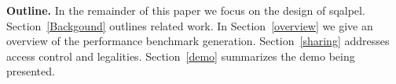 \documentclass{cidr-2019}
\begin{document}



 

{\bf Outline.} In the remainder of this paper we focus on the design
of {\sc sqalpel}. Section~\ref{Backgound} outlines related work. In
Section~\ref{overview} we give an overview of the performance
benchmark generation. Section~\ref{sharing} addresses access control
and legalities. Section~\ref{demo} summarizes the demo being
presented.
\end{document}
